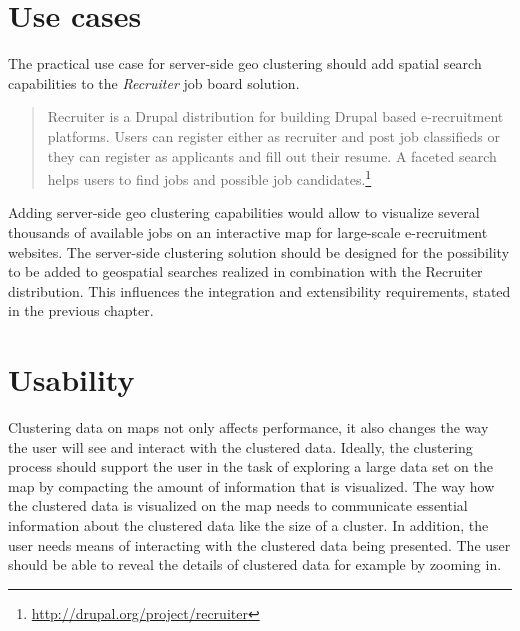 \section{Use cases}

The practical use case for server-side geo clustering should add spatial search capabilities to the \textit{Recruiter} job board solution.

\begin{quote}
Recruiter is a Drupal distribution for building Drupal based e-recruitment platforms. Users can register either as recruiter and post job classifieds or they can register as applicants and fill out their resume. A faceted search helps users to find jobs and possible job candidates.\footnote{\url{http://drupal.org/project/recruiter}}
\end{quote}

Adding server-side geo clustering capabilities would allow to visualize several thousands of available jobs on an interactive map for large-scale e-recruitment websites. The server-side clustering solution should be designed for the possibility to be added to geospatial searches realized in combination with the Recruiter distribution. This influences the integration and extensibility requirements, stated in the previous chapter.

\section{Usability}

Clustering data on maps not only affects performance, it also changes the way the user will see and interact with the clustered data. Ideally, the clustering process should support the user in the task of exploring a large data set on the map by compacting the amount of information that is visualized. The way how the clustered data is visualized on the map needs to communicate essential information about the clustered data like the size of a cluster. In addition, the user needs means of interacting with the clustered data being presented. The user should be able to reveal the details of clustered data for example by zooming in. 

















